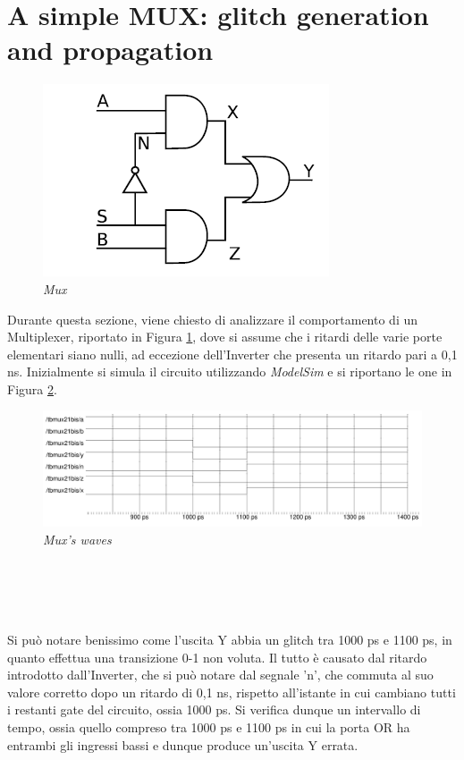 \section{A simple MUX: glitch generation and propagation}
\begin{figure}[!htb]
	\centering
	\includegraphics[scale=0.8]{immagini/mux}
	\caption{\textit{Mux}}
	\label{mux}
\end{figure}
\noindent Durante questa sezione, viene chiesto di analizzare il comportamento di un Multiplexer, riportato in Figura \ref{mux}, dove si assume che i ritardi delle varie porte elementari siano nulli, ad eccezione dell'Inverter che presenta un ritardo pari a 0,1 ns. Inizialmente si simula il circuito utilizzando \textit{ModelSim} e si riportano le one in Figura \ref{model_mux}.
\begin{figure}[!htb]
	\centering
	\includegraphics[scale=0.25]{immagini/model_mux}
	\caption{\textit{Mux's waves}}
	\label{model_mux}
\end{figure}
\\
\\
\\
\\
Si può notare benissimo come l'uscita Y abbia un glitch tra 1000 ps e 1100 ps, in quanto effettua una transizione 0-1 non voluta. Il tutto è causato dal ritardo introdotto dall'Inverter, che si può notare dal segnale 'n', che commuta al suo valore corretto dopo un ritardo di 0,1 ns, rispetto all'istante in cui cambiano tutti i restanti gate del circuito, ossia 1000 ps. Si verifica dunque un intervallo di tempo, ossia quello compreso tra 1000 ps e 1100 ps in cui la porta OR ha entrambi gli ingressi bassi e dunque produce un'uscita Y errata. \\
